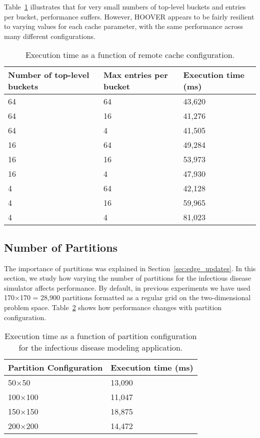 Table~\ref{tab:cache} illustrates that for very small numbers of
top-level buckets and entries per bucket, performance suffers. However, HOOVER
appears to be fairly resilient to varying values for each cache parameter, with
the same performance across many different configurations.

\begin{table}
\centering
\begin{tabularx}{\textwidth}{ | X | X | X | }
\hline
Number of top-level buckets & Max entries per bucket & Execution time (ms) \\\hline
64                          & 64                     & 43,620 \\\hline
64                          & 16                     & 41,276 \\\hline
64                          & 4                      & 41,505 \\\hline
16                          & 64                     & 49,284 \\\hline
16                          & 16                     & 53,973 \\\hline
16                          & 4                      & 47,930 \\\hline
4                           & 64                     & 42,128 \\\hline
4                           & 16                     & 59,965 \\\hline
4                           & 4                      & 81,023 \\\hline
\end{tabularx}
\caption{Execution time as a function of remote cache configuration.}
\label{tab:cache}
\end{table}

\subsection{Number of Partitions}

The importance of partitions was explained in Section~\ref{sec:edge_updates}. In
this section, we study how varying the number of partitions for the infectious
disease simulator affects performance. By default, in previous experiments we
have used 170$\times$170 = 28,900 partitions formatted as a regular grid on the
two-dimensional problem space. Table~\ref{tab:partitions} shows how performance
changes with partition configuration.

\begin{table}
\centering
\begin{tabularx}{\textwidth}{ | X | X | }
\hline
Partition Configuration & Execution time (ms) \\\hline
50$\times$50            & 13,090 \\\hline
100$\times$100          & 11,047 \\\hline
150$\times$150          & 18,875 \\\hline
200$\times$200          & 14,472 \\\hline
\end{tabularx}
\caption{Execution time as a function of partition configuration for the
    infectious disease modeling application.}
\label{tab:partitions}
\end{table}
